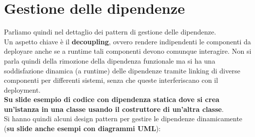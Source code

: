 \documentclass[a4paper,12pt, oneside]{book}
\begin{document}
\section{Gestione delle dipendenze}
Parliamo quindi nel dettaglio dei pattern di gestione delle dipendenze.\\
Un aspetto chiave è il \textbf{decoupling}, ovvero rendere indipendenti le
componenti da deployare anche se a runtime tali componenti devono comunque
interagire. Non si parla quindi della rimozione della dipendenza funzionale ma
si ha una soddisfazione dinamica (a runtime) delle dipendenze tramite linking di
diverse 
componenti per differenti sistemi, senza che queste interferiscano con il
deployment. \\
\textbf{Su slide esempio di codice con dipendenza statica dove si crea
  un'istanza in una classe usando il costruttore di un'altra classe}.\\
Si hanno quindi alcuni design pattern per gestire le dipendenze dinamicamente
(\textbf{su slide anche esempi con diagrammi UML}):
\end{document}
